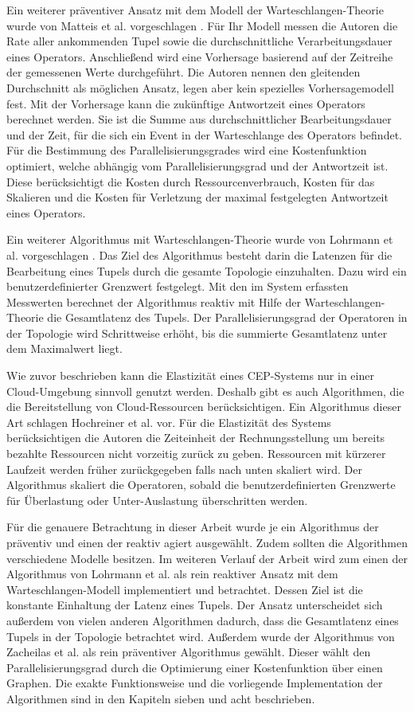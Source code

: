 Ein weiterer präventiver Ansatz mit dem Modell der Warteschlangen-Theorie wurde von Matteis et al. vorgeschlagen \cite{matteis_elastic_2017}.
Für Ihr Modell messen die Autoren die Rate aller ankommenden Tupel sowie die durchschnittliche Verarbeitungsdauer eines Operators.
Anschließend wird eine Vorhersage basierend auf der Zeitreihe der gemessenen Werte durchgeführt. 
Die Autoren nennen den gleitenden Durchschnitt als möglichen Ansatz, legen aber kein spezielles Vorhersagemodell fest. 
Mit der Vorhersage kann die zukünftige Antwortzeit eines Operators berechnet werden.
Sie ist die Summe aus durchschnittlicher Bearbeitungsdauer und der Zeit, für die sich ein Event in der Warteschlange des Operators befindet.
Für die Bestimmung des Parallelisierungsgrades wird eine Kostenfunktion optimiert, welche abhängig vom Parallelisierungsgrad und der Antwortzeit ist.
Diese berücksichtigt die Kosten durch Ressourcenverbrauch, Kosten für das Skalieren und die Kosten für Verletzung der maximal festgelegten Antwortzeit eines Operators. 

Ein weiterer Algorithmus mit Warteschlangen-Theorie wurde von Lohrmann et al. vorgeschlagen \cite{lohrmann_elastic_2015}.
Das Ziel des Algorithmus besteht darin die Latenzen für die Bearbeitung eines Tupels durch die gesamte Topologie einzuhalten.
Dazu wird ein benutzerdefinierter Grenzwert festgelegt.
Mit den im System erfassten Messwerten berechnet der Algorithmus reaktiv mit Hilfe der Warteschlangen-Theorie die Gesamtlatenz des Tupels.
Der Parallelisierungsgrad der Operatoren in der Topologie wird Schrittweise erhöht, bis die summierte Gesamtlatenz unter dem Maximalwert liegt.

Wie zuvor beschrieben kann die Elastizität eines CEP-Systems nur in einer Cloud-Umgebung sinnvoll genutzt werden.
Deshalb gibt es auch Algorithmen, die die Bereitstellung von Cloud-Ressourcen berücksichtigen.
Ein Algorithmus dieser Art schlagen Hochreiner et al. vor.
Für die Elastizität des Systems berücksichtigen die Autoren die Zeiteinheit der Rechnungsstellung um bereits bezahlte Ressourcen nicht vorzeitig zurück zu geben.
Ressourcen mit kürzerer Laufzeit werden früher zurückgegeben falls nach unten skaliert wird.
Der Algorithmus skaliert die Operatoren, sobald die benutzerdefinierten Grenzwerte für Überlastung oder Unter-Auslastung überschritten werden.

Für die genauere Betrachtung in dieser Arbeit wurde je ein Algorithmus der präventiv und einen der reaktiv agiert ausgewählt.
Zudem sollten die Algorithmen verschiedene Modelle besitzen.
Im weiteren Verlauf der Arbeit wird zum einen der Algorithmus von Lohrmann et al. als rein reaktiver Ansatz mit dem Warteschlangen-Modell implementiert und betrachtet.
Dessen Ziel ist die konstante Einhaltung der Latenz eines Tupels.
Der Ansatz unterscheidet sich außerdem von vielen anderen Algorithmen dadurch, dass die Gesamtlatenz eines Tupels in der Topologie betrachtet wird.
Außerdem wurde der Algorithmus von Zacheilas et al. als rein präventiver Algorithmus gewählt.
Dieser wählt den Parallelisierungsgrad durch die Optimierung einer Kostenfunktion über einen Graphen.
Die exakte Funktionsweise und die vorliegende Implementation der Algorithmen sind in den Kapiteln sieben und acht beschrieben.




